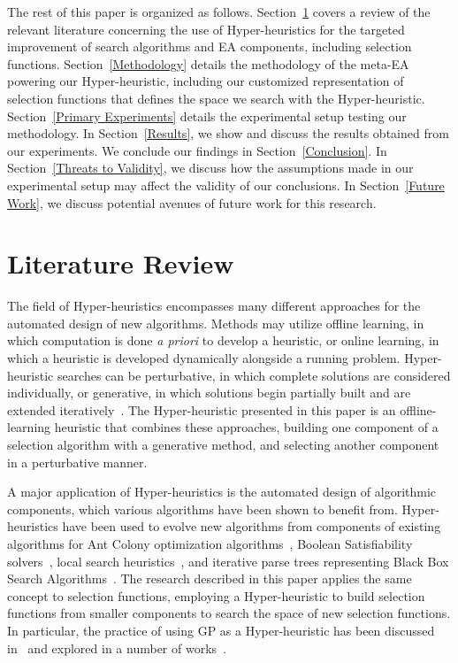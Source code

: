 \documentclass[sigconf]{acmart}
\begin{document}
The rest of this paper is organized as follows. Section~\ref{Literature Review} covers a review of the relevant literature concerning the use of Hyper-heuristics for the targeted improvement of search algorithms and EA components, including selection functions. Section~\ref{Methodology} details the methodology of the meta-EA powering our Hyper-heuristic, including our customized representation of selection functions that defines the space we search with the Hyper-heuristic.  Section~\ref{Primary Experiments} details the experimental setup testing our methodology. In Section~\ref{Results}, we show and discuss the results obtained from our experiments. We conclude our findings in Section~\ref{Conclusion}. In Section~\ref{Threats to Validity}, we discuss how the assumptions made in our experimental setup may affect the validity of our conclusions. In Section~\ref{Future Work}, we discuss potential avenues of future work for this research.

\section{Literature Review}
\label{Literature Review}
The field of Hyper-heuristics encompasses many different approaches for the automated design of new algorithms. Methods may utilize offline learning, in which computation is done \textit{a priori} to develop a heuristic, or online learning, in which a heuristic is developed dynamically alongside a running problem. Hyper-heuristic searches can be perturbative, in which complete solutions are considered individually, or generative, in which solutions begin partially built and are extended iteratively~\citep{burke2013HHstateoftheart}. The Hyper-heuristic presented in this paper is an offline-learning heuristic that combines these approaches, building one component of a selection algorithm with a generative method, and selecting another component in a perturbative manner.

A major application of Hyper-heuristics is the automated design of algorithmic components, which various algorithms have been shown to benefit from. Hyper-heuristics have been used to evolve new algorithms from components of existing algorithms for Ant Colony optimization algorithms~\citep{lopez2012antcol}, Boolean Satisfiability solvers~\citep{khudabukhsh2009satenstein}, local search heuristics~\citep{burke2012localHeuristics}, and iterative parse trees representing Black Box Search Algorithms~\citep{martin2013evolvingBBSA}. The research described in this paper applies the same concept to selection functions, employing a Hyper-heuristic to build selection functions from smaller components to search the space of new selection functions. In particular, the practice of using GP as a Hyper-heuristic has been discussed in~\citep{burke2009exploring} and explored in a number of works~\citep{burke2010strippacking, burke2006binpacking, harris2015comparison}. 
\end{document}
